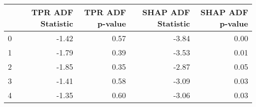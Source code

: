 \begin{tabular}{lrrrr}
\toprule
 & TPR ADF Statistic & TPR ADF p-value & SHAP ADF Statistic & SHAP ADF p-value \\
\midrule
0 & -1.42 & 0.57 & -3.84 & 0.00 \\
1 & -1.79 & 0.39 & -3.53 & 0.01 \\
2 & -1.85 & 0.35 & -2.87 & 0.05 \\
3 & -1.41 & 0.58 & -3.09 & 0.03 \\
4 & -1.35 & 0.60 & -3.06 & 0.03 \\
\bottomrule
\end{tabular}
